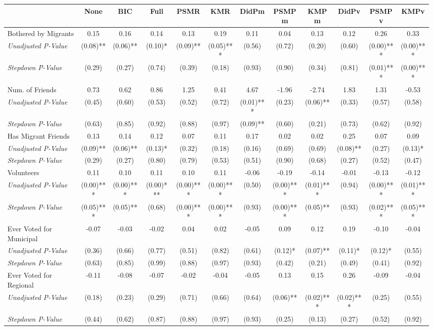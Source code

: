 \begin{tabular}{l c c c c c c c c c c c}
\toprule
 & None & BIC & Full & PSMR & KMR & DidPm & PSMPm & KMPm & DidPv & PSMPv & KMPv \\
\midrule
Bothered by Migrants & 0.15 & 0.16 & 0.14 & 0.13 & 0.19 & 0.11 & 0.04 & 0.13 & 0.12 & 0.26 & 0.33 \\
\quad \textit{Unadjusted P-Value} & (0.08)** & (0.06)** & (0.10)* & (0.09)** & (0.05)*** & (0.56) & (0.72) & (0.20) & (0.60) & (0.00)*** & (0.00)*** \\
\quad \textit{Stepdown P-Value} & (0.29) & (0.27) & (0.74) & (0.39) & (0.18) & (0.93) & (0.90) & (0.34) & (0.81) & (0.01)*** & (0.00)*** \\
Num. of Friends & 0.73 & 0.62 & 0.86 & 1.25 & 0.41 & 4.67 & -1.96 & -2.74 & 1.83 & 1.31 & -0.53 \\
\quad \textit{Unadjusted P-Value} & (0.45) & (0.60) & (0.53) & (0.52) & (0.72) & (0.01)*** & (0.23) & (0.06)** & (0.33) & (0.57) & (0.58) \\
\quad \textit{Stepdown P-Value} & (0.63) & (0.85) & (0.92) & (0.88) & (0.97) & (0.09)** & (0.60) & (0.21) & (0.73) & (0.62) & (0.92) \\
Has Migrant Friends & 0.13 & 0.14 & 0.12 & 0.07 & 0.11 & 0.17 & 0.02 & 0.02 & 0.25 & 0.07 & 0.09 \\
\quad \textit{Unadjusted P-Value} & (0.09)** & (0.06)** & (0.13)* & (0.32) & (0.18) & (0.16) & (0.69) & (0.69) & (0.08)** & (0.27) & (0.13)* \\
\quad \textit{Stepdown P-Value} & (0.29) & (0.27) & (0.80) & (0.79) & (0.53) & (0.51) & (0.90) & (0.68) & (0.27) & (0.52) & (0.47) \\
Volunteers & 0.11 & 0.10 & 0.11 & 0.10 & 0.11 & -0.06 & -0.19 & -0.14 & -0.01 & -0.13 & -0.12 \\
\quad \textit{Unadjusted P-Value} & (0.00)*** & (0.00)*** & (0.00)*** & (0.00)*** & (0.00)*** & (0.50) & (0.00)*** & (0.01)*** & (0.94) & (0.00)*** & (0.01)*** \\
\quad \textit{Stepdown P-Value} & (0.05)*** & (0.05)** & (0.68) & (0.00)*** & (0.00)*** & (0.93) & (0.00)*** & (0.05)** & (0.93) & (0.02)*** & (0.05)*** \\
Ever Voted for Municipal & -0.07 & -0.03 & -0.02 & 0.04 & 0.02 & -0.05 & 0.09 & 0.12 & 0.19 & -0.10 & -0.04 \\
\quad \textit{Unadjusted P-Value} & (0.36) & (0.66) & (0.77) & (0.51) & (0.82) & (0.61) & (0.12)* & (0.07)** & (0.11)* & (0.12)* & (0.55) \\
\quad \textit{Stepdown P-Value} & (0.63) & (0.85) & (0.99) & (0.88) & (0.97) & (0.93) & (0.42) & (0.21) & (0.49) & (0.41) & (0.92) \\
Ever Voted for Regional & -0.11 & -0.08 & -0.07 & -0.02 & -0.04 & -0.05 & 0.13 & 0.15 & 0.26 & -0.09 & -0.04 \\
\quad \textit{Unadjusted P-Value} & (0.18) & (0.23) & (0.29) & (0.71) & (0.66) & (0.64) & (0.06)** & (0.02)*** & (0.02)*** & (0.25) & (0.55) \\
\quad \textit{Stepdown P-Value} & (0.44) & (0.62) & (0.87) & (0.88) & (0.97) & (0.93) & (0.25) & (0.13) & (0.27) & (0.52) & (0.92) \\
\bottomrule
\end{tabular}
